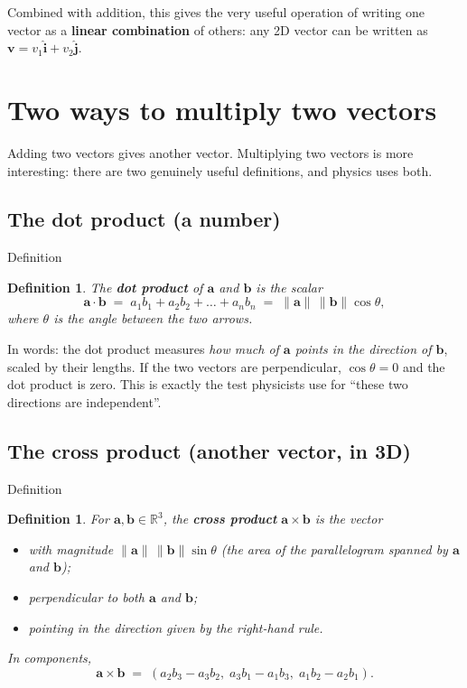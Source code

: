 \documentclass[11pt,a4paper]{article}
\newtheorem{definition}[theorem]{Definition}
\newcommand{\vect}[1]{\boldsymbol{#1}}
\newcommand{\vhat}[1]{\hat{\boldsymbol{#1}}}
\begin{document}
Combined with addition, this gives the very useful operation of writing one vector
as a \textbf{linear combination} of others: any 2D vector can be written as
$\vect{v} = v_1 \vhat{i} + v_2 \vhat{j}$.

\section{Two ways to multiply two vectors}

Adding two vectors gives another vector. Multiplying two vectors is more interesting:
there are two genuinely useful definitions, and physics uses both.

\subsection{The dot product (a number)}

\begin{mathblock}{Definition}
\begin{definition}
The \textbf{dot product} of $\vect{a}$ and $\vect{b}$ is the scalar
\[
  \vect{a}\cdot\vect{b}
  \;=\; a_1 b_1 + a_2 b_2 + \dots + a_n b_n
  \;=\; \lVert\vect{a}\rVert\,\lVert\vect{b}\rVert \cos\theta,
\]
where $\theta$ is the angle between the two arrows.
\end{definition}
\end{mathblock}

In words: the dot product measures \emph{how much of $\vect{a}$ points in the
direction of $\vect{b}$}, scaled by their lengths. If the two vectors are
perpendicular, $\cos\theta = 0$ and the dot product is zero. This is exactly the
test physicists use for ``these two directions are independent''.

\subsection{The cross product (another vector, in 3D)}

\begin{mathblock}{Definition}
\begin{definition}
For $\vect{a},\vect{b}\in\mathbb{R}^3$, the \textbf{cross product} $\vect{a}\times\vect{b}$
is the vector
\begin{itemize}
  \item with magnitude $\lVert\vect{a}\rVert\,\lVert\vect{b}\rVert \sin\theta$
        (the area of the parallelogram spanned by $\vect{a}$ and $\vect{b}$);
  \item perpendicular to \emph{both} $\vect{a}$ and $\vect{b}$;
  \item pointing in the direction given by the right-hand rule.
\end{itemize}
In components,
\[
  \vect{a}\times\vect{b}
  \;=\;
  (a_2 b_3 - a_3 b_2,\; a_3 b_1 - a_1 b_3,\; a_1 b_2 - a_2 b_1).
\]
\end{definition}
\end{mathblock}
\end{document}
